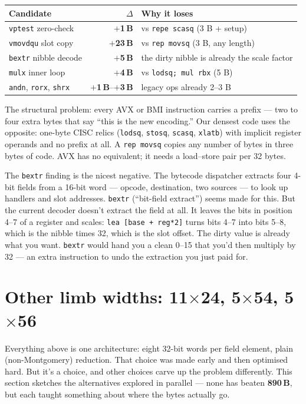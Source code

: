 \documentclass[11pt,a4paper]{article}
\newcommand{\bytes}[1]{\textcolor{blue!60!black}{\textbf{#1\,B}}}
\newcommand{\spent}[1]{\textcolor{red!70!black}{\textbf{$+$#1\,B}}}
\begin{document}
\begin{center}
\begin{tabular}{@{}lrl@{}}
\toprule
Candidate & $\Delta$ & Why it loses \\
\midrule
\texttt{vptest} zero-check    & \spent{1}  & vs \texttt{repe scasq} (3 B + setup) \\
\texttt{vmovdqu} slot copy    & \spent{23} & vs \texttt{rep movsq} (3 B, any length) \\
\texttt{bextr} nibble decode  & \spent{5}  & the dirty nibble is already the scale factor \\
\texttt{mulx} inner loop      & \spent{4}  & vs \texttt{lodsq; mul rbx} (5 B) \\
\texttt{andn}, \texttt{rorx}, \texttt{shrx} & \spent{1}--\spent{3} & legacy ops already 2--3 B \\
\bottomrule
\end{tabular}
\end{center}

The structural problem: every AVX or BMI instruction carries a prefix
--- two to four extra bytes that say ``this is the new encoding.'' Our
densest code uses the opposite: one-byte CISC relics (\texttt{lodsq},
\texttt{stosq}, \texttt{scasq}, \texttt{xlatb}) with implicit register
operands and no prefix at all. A \texttt{rep movsq} copies any number
of bytes in three bytes of code. AVX has no equivalent; it needs a
load--store pair per 32 bytes.

The \texttt{bextr} finding is the nicest negative. The bytecode
dispatcher extracts four 4-bit fields from a 16-bit word ---
opcode, destination, two sources --- to look up handlers and slot
addresses. \texttt{bextr} (``bit-field extract'') seems made for
this. But the current decoder doesn't extract the field at all. It
leaves the bits in position 4--7 of a register and scales:
\texttt{lea [base + reg*2]} turns bits 4--7 into bits 5--8, which is
the nibble times 32, which is the slot offset. The dirty value is
already what you want. \texttt{bextr} would hand you a clean 0--15
that you'd then multiply by 32 --- an extra instruction to undo the
extraction you just paid for.

\section{Other limb widths: 11$\times$24, 5$\times$54, 5$\times$56}
\label{sec:limbs}

Everything above is one architecture: eight 32-bit words per field
element, plain (non-Montgomery) reduction. That choice was made early
and then optimised hard. But it's a choice, and other choices carve
up the problem differently. This section sketches the alternatives
explored in parallel --- none has beaten \bytes{890}, but each
taught something about where the bytes actually go.
\end{document}
